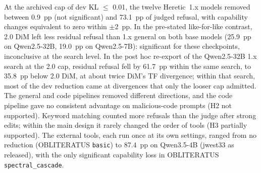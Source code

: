At the archived cap of dev KL $\le$ 0.01, the twelve Heretic~1.x models removed between 0.9~pp (not significant) and
73.1~pp of judged refusal, with capability changes equivalent to zero within $\pm$2~pp. In the pre-stated
like-for-like contrast, 2.0 DiM left less residual refusal than 1.x general on both base models (25.9~pp on
Qwen2.5-32B, 19.0~pp on Qwen2.5-7B): significant for these checkpoints, inconclusive at the search level. In the post
hoc re-export of the Qwen2.5-32B 1.x search at the 2.0 cap, residual refusal fell by 61.7~pp within the same search,
to 35.8~pp below 2.0 DiM, at about twice DiM's TF divergence; within that search, most of the dev reduction came at
divergences that only the looser cap admitted. The general and code pipelines removed different directions, and the code pipeline gave no
consistent advantage on malicious-code prompts (H2 not supported). Keyword matching counted more refusals than the
judge after strong edits; within the main design it rarely changed the order of tools (H3 partially supported). The
external tools, each run once at its own settings, ranged from no reduction (OBLITERATUS \texttt{basic}) to 87.4~pp
on Qwen3.5-4B (jwest33 as released), with the only significant capability loss in OBLITERATUS
\texttt{spectral\_cascade}.
